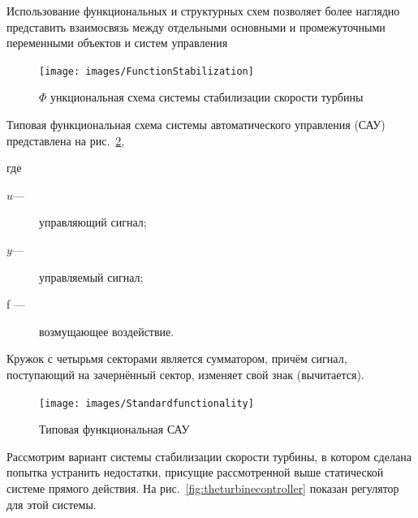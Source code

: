 Использование функциональных и структурных схем позволяет более наглядно представить взаимосвязь между отдельными основными и промежуточными переменными объектов и систем управления

\begin{figure}[h!]
	\centering
	\texttt{[image: images/FunctionStabilization]}
	\caption{$ \Phi $ ункциональная схема системы стабилизации скорости турбины}
	\label{fig:functionstabilization}
\end{figure}

Типовая функциональная схема системы автоматического управления (САУ) представлена на рис.~\ref{fig:standardfunctionality},

где \begin{description}
		\item[$ u $---] управляющий сигнал;
		\item[$ y $---] управляемый сигнал;
		\item[f ---] возмущающее воздействие.
\end{description}

Кружок с четырьмя секторами является сумматором, причём сигнал, поступающий на зачернённый сектор, изменяет свой знак (вычитается).

\begin{figure}[h]
	\centering
	\texttt{[image: images/Standardfunctionality]}
	\caption{Типовая функциональная САУ}
	\label{fig:standardfunctionality}
\end{figure}

Рассмотрим вариант системы стабилизации скорости турбины, в котором сделана попытка устранить недостатки, 
присущие рассмотренной выше статической системе прямого действия. На рис.~\ref{fig:theturbinecontroller} показан регулятор для этой системы.

